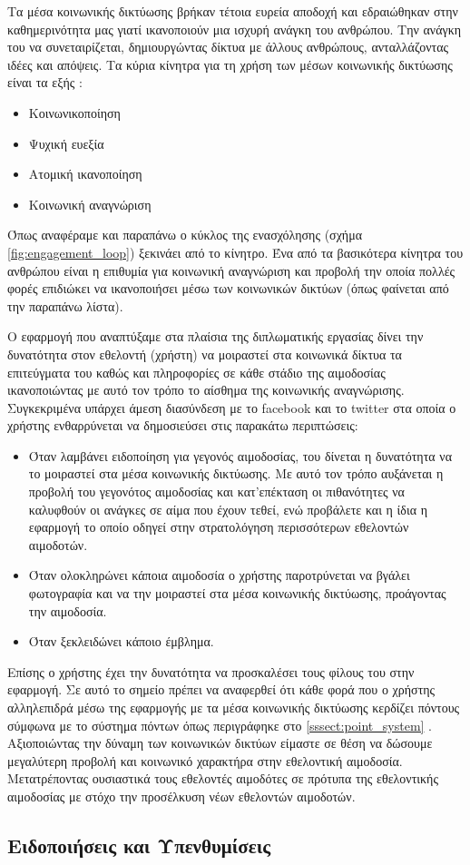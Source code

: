 	Τα μέσα κοινωνικής δικτύωσης βρήκαν τέτοια ευρεία αποδοχή και εδραιώθηκαν στην καθημερινότητα μας γιατί ικανοποιούν μια ισχυρή ανάγκη του ανθρώπου. Την ανάγκη του να συνεταιρίζεται, δημιουργώντας δίκτυα με άλλους ανθρώπους, ανταλλάζοντας ιδέες και απόψεις. Τα κύρια κίνητρα για τη χρήση των μέσων κοινωνικής δικτύωσης είναι τα εξής \cite{Benkler2006}:
	\begin{itemize}
		\item Κοινωνικοποίηση
		\item Ψυχική ευεξία
		\item Ατομική ικανοποίηση
		\item Κοινωνική αναγνώριση
	\end{itemize}		
	
	Όπως αναφέραμε και παραπάνω ο κύκλος της ενασχόλησης (σχήμα \ref{fig:engagement_loop}) ξεκινάει από το κίνητρο. Ένα από τα βασικότερα κίνητρα του ανθρώπου είναι η επιθυμία για κοινωνική αναγνώριση και προβολή \cite{Gamification_on_Participation} την οποία πολλές φορές επιδιώκει να ικανοποιήσει μέσω των κοινωνικών δικτύων (όπως φαίνεται από την παραπάνω λίστα).
	
	Ο εφαρμογή που αναπτύξαμε στα πλαίσια της διπλωματικής εργασίας δίνει την δυνατότητα στον εθελοντή (χρήστη) να μοιραστεί στα κοινωνικά δίκτυα τα επιτεύγματα του καθώς και πληροφορίες σε κάθε στάδιο της αιμοδοσίας ικανοποιώντας με αυτό τον τρόπο το αίσθημα της κοινωνικής αναγνώρισης. Συγκεκριμένα υπάρχει άμεση διασύνδεση με το facebook και το twitter στα οποία ο χρήστης ενθαρρύνεται να δημοσιεύσει στις παρακάτω περιπτώσεις:
	\begin{itemize}
		\item Όταν λαμβάνει ειδοποίηση για γεγονός αιμοδοσίας, του δίνεται η δυνατότητα να το μοιραστεί στα μέσα κοινωνικής δικτύωσης. Με αυτό τον τρόπο αυξάνεται η προβολή του γεγονότος αιμοδοσίας και κατ'επέκταση οι πιθανότητες να καλυφθούν οι ανάγκες σε αίμα που έχουν τεθεί, ενώ προβάλετε και η ίδια η εφαρμογή το οποίο οδηγεί στην στρατολόγηση περισσότερων εθελοντών αιμοδοτών.
		\item Όταν ολοκληρώνει κάποια αιμοδοσία ο χρήστης παροτρύνεται να βγάλει φωτογραφία και να την μοιραστεί στα μέσα κοινωνικής δικτύωσης, προάγοντας την αιμοδοσία.
		\item Όταν ξεκλειδώνει κάποιο έμβλημα.
	\end{itemize}
	
	Επίσης ο χρήστης έχει την δυνατότητα να προσκαλέσει τους φίλους του στην εφαρμογή. Σε αυτό το σημείο πρέπει να αναφερθεί ότι κάθε φορά που ο χρήστης αλληλεπιδρά μέσω της εφαρμογής με τα μέσα κοινωνικής δικτύωσης κερδίζει πόντους σύμφωνα με το σύστημα πόντων όπως περιγράφηκε στο \ref{sssect:point_system} . Αξιοποιώντας την δύναμη των κοινωνικών δικτύων είμαστε σε θέση να δώσουμε μεγαλύτερη προβολή και κοινωνικό χαρακτήρα στην εθελοντική αιμοδοσία. Μετατρέποντας ουσιαστικά τους εθελοντές αιμοδότες σε πρότυπα της εθελοντικής αιμοδοσίας με στόχο την προσέλκυση νέων εθελοντών αιμοδοτών.
	\subsection{Ειδοποιήσεις και Υπενθυμίσεις}
